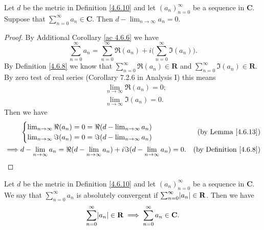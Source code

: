 \begin{additional corollary}\label{ac 4.6.7}
Let \(d\) be the metric in Definition \ref{4.6.10} and let \((a_n)_{n = 0}^\infty\) be a sequence in \(\mathbf{C}\).
Suppose that \(\sum_{n = 0}^\infty a_n \in \mathbf{C}\).
Then \(d - \lim_{n \to \infty} a_n = 0\).
\end{additional corollary}

\begin{proof}
    By Additional Corollary \ref{ac 4.6.6} we have
    \[
        \sum_{n = 0}^\infty a_n = \sum_{n = 0}^\infty \Re(a_n) + i \bigg(\sum_{n = 0}^\infty \Im(a_n)\bigg).
    \]
    By Definition \ref{4.6.8} we know that \(\sum_{n = 0}^\infty \Re(a_n) \in \mathbf{R}\) and \(\sum_{n = 0}^\infty \Im(a_n) \in \mathbf{R}\).
    By zero test of real series (Corollary 7.2.6 in Analysis I) this means
    \begin{align*}
         & \lim_{n \to \infty} \Re(a_n) = 0; \\
         & \lim_{n \to \infty} \Im(a_n) = 0.
    \end{align*}
    Then we have
    \begin{align*}
                 & \begin{cases}
            \lim_{n \to \infty} \Re(a_n) = 0 = \Re(d - \lim_{n \to \infty} a_n) \\
            \lim_{n \to \infty} \Im(a_n) = 0 = \Im(d - \lim_{n \to \infty} a_n)
        \end{cases}                                                                               & \text{(by Lemma \ref{4.6.13})}     \\
        \implies & d - \lim_{n \to \infty} a_n = \Re(d - \lim_{n \to \infty} a_n) + i \Im(d - \lim_{n \to \infty} a_n) = 0. & \text{(by Definition \ref{4.6.8})}
    \end{align*}
\end{proof}

\begin{additional corollary}\label{ac 4.6.8}
Let \(d\) be the metric in Definition \ref{4.6.10} and let \((a_n)_{n = 0}^\infty\) be a sequence in \(\mathbf{C}\).
We say that \(\sum_{n = 0}^\infty a_n\) is absolutely convergent if \(\sum_{n = 0}^\infty \abs*{a_n} \in \mathbf{R}\).
Then we have
\[
    \sum_{n = 0}^\infty \abs*{a_n} \in \mathbf{R} \implies \sum_{n = 0}^\infty a_n \in \mathbf{C}.
\]
\end{additional corollary}

